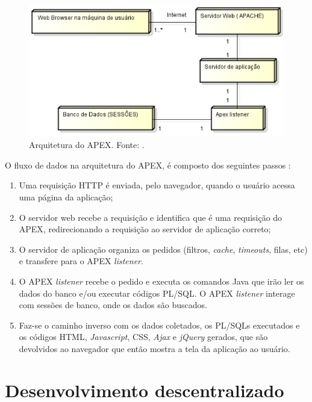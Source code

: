 \begin{figure}[!htb]
	\centering
	\includegraphics[scale=0.6]{figuras/arquitetura_apex}
	\caption{Arquitetura do APEX. Fonte: \cite{ferreira2015}.}
\end{figure}

O fluxo de dados na arquitetura do APEX, é composto dos seguintes passos \cite{ferreira2015}:
\begin{enumerate}
	\item Uma requisição HTTP é enviada, pelo navegador, quando o usuário acessa uma página da aplicação;
	\item O servidor web recebe a requisição e identifica que é uma requisição do APEX, redirecionando a requisição ao servidor de aplicação correto;
	\item O servidor de aplicação organiza os pedidos (filtros, \textit{cache}, \textit{timeouts}, filas, etc) e transfere para o APEX \textit{listener}.
	\item O APEX \textit{listener} recebe o pedido e executa os comandos Java que irão ler os dados do banco e/ou executar códigos PL/SQL. O APEX \textit{listener} interage com sessões de banco, onde os dados são buscados.
	\item Faz-se o caminho inverso com os dados coletados, os PL/SQLs executados e os códigos HTML, \textit{Javascript}, CSS, \textit{Ajax} e \textit{jQuery} gerados, que são devolvidos ao navegador que então mostra a tela da aplicação ao usuário.
\end{enumerate}

\clearpage

\section{Desenvolvimento descentralizado}

